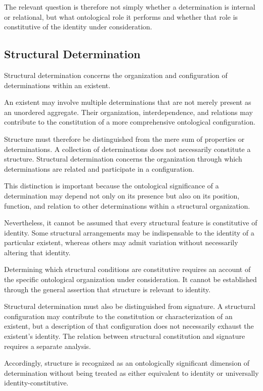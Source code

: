 The relevant question is therefore not simply whether a
determination is internal or relational, but what ontological
role it performs and whether that role is constitutive of
the identity under consideration.

\subsection{Structural Determination}

Structural determination concerns the organization and
configuration of determinations within an existent.

An existent may involve multiple determinations that are
not merely present as an unordered aggregate. Their
organization, interdependence, and relations may contribute
to the constitution of a more comprehensive ontological
configuration.

Structure must therefore be distinguished from the mere
sum of properties or determinations. A collection of
determinations does not necessarily constitute a structure.
Structural determination concerns the organization through
which determinations are related and participate in a
configuration.

This distinction is important because the ontological
significance of a determination may depend not only on
its presence but also on its position, function, and relation
to other determinations within a structural organization.

Nevertheless, it cannot be assumed that every structural
feature is constitutive of identity. Some structural
arrangements may be indispensable to the identity of
a particular existent, whereas others may admit variation
without necessarily altering that identity.

Determining which structural conditions are constitutive
requires an account of the specific ontological organization
under consideration. It cannot be established through
the general assertion that structure is relevant to identity.

Structural determination must also be distinguished from
signature. A structural configuration may contribute to
the constitution or characterization of an existent, but
a description of that configuration does not necessarily
exhaust the existent's identity. The relation between
structural constitution and signature requires a separate
analysis.

Accordingly, structure is recognized as an ontologically
significant dimension of determination without being
treated as either equivalent to identity or universally
identity-constitutive.

